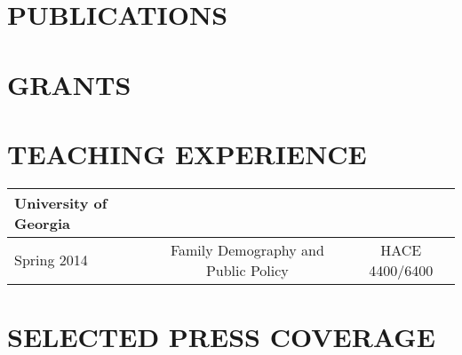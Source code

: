 \documentclass[letterpaper,11pt]{article}
\begin{document}

\section{PUBLICATIONS}



\section{GRANTS}


\section{TEACHING EXPERIENCE}
\begin{tabularx}{\linewidth}{l c c}
\textbf{University of Georgia} & & \\
\hline
Spring 2014 & Family Demography and Public Policy & HACE 4400/6400\\
\hline
\end{tabularx}



\section{SELECTED PRESS COVERAGE}

\end{document}
